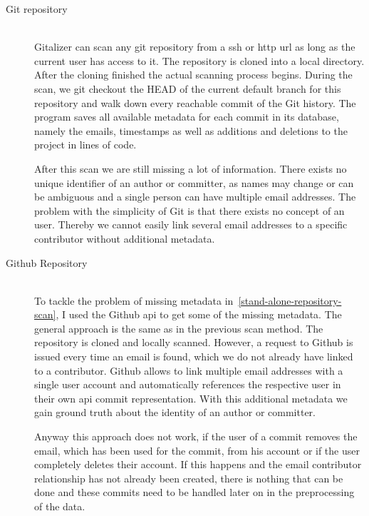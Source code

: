 \begin{description}
    \item[Git repository]\label{stand-alone-repository-scan} \hfill \\
        Gitalizer can scan any git repository from a \ac{ssh} or \ac{http} \acs{url} as long as the current user has access to it.
        The repository is cloned into a local directory. After the cloning finished the actual scanning process begins.
        During the scan, we git checkout the HEAD of the current default branch for this repository and walk down every reachable commit of the Git history.
        The program saves all available metadata for each commit in its database, namely the emails, timestamps as well as additions and deletions to the project in lines of code.

        After this scan we are still missing a lot of information.
        There exists no unique identifier of an author or committer, as names may change or can be ambiguous and a single person can have multiple email addresses.
        The problem with the simplicity of Git is that there exists no concept of an user.
        Thereby we cannot easily link several email addresses to a specific contributor without additional metadata.


    \item[Github Repository]\label{github-repo-scan} \hfill \\
        To tackle the problem of missing metadata in~\ref{stand-alone-repository-scan}, I used the Github \ac{api} to get some of the missing metadata.
        The general approach is the same as in the previous scan method. The repository is cloned and locally scanned.
        However, a request to Github is issued every time an email is found, which we do not already have linked to a contributor.
        Github allows to link multiple email addresses with a single user account and automatically references the respective user in their own \ac{api} commit representation.
        With this additional metadata we gain ground truth about the identity of an author or committer.

        Anyway this approach does not work, if the user of a commit removes the email, which has been used for the commit, from his account or if the user completely deletes their account.
        If this happens and the email contributor relationship has not already been created, there is nothing that can be done and these commits need to be handled later on in the preprocessing of the data.


\end{description}
